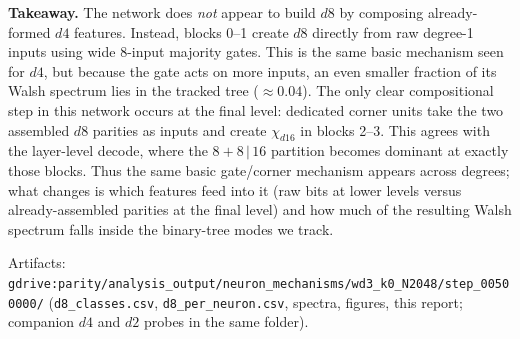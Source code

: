 \documentclass[10pt]{article}
\begin{document}
\textbf{Takeaway.} The network does \emph{not} appear to build $d8$ by composing already-formed
$d4$ features. Instead, blocks 0--1 create $d8$ directly from raw degree-1 inputs using wide
8-input majority gates. This is the same basic mechanism seen for $d4$, but because the gate
acts on more inputs, an even smaller fraction of its Walsh spectrum lies in the tracked tree
($\approx0.04$). The only clear compositional step in this network occurs at the final level:
dedicated corner units take the two assembled $d8$ parities as inputs and create
$\chi_{d16}$ in blocks 2--3. This agrees with the layer-level decode, where the
$8{+}8\,|\,16$ partition becomes dominant at exactly those blocks. Thus the same basic
gate/corner mechanism appears across degrees; what changes is which features feed into it
(raw bits at lower levels versus already-assembled parities at the final level) and how much
of the resulting Walsh spectrum falls inside the binary-tree modes we track.

\vfill\footnotesize
Artifacts: \texttt{gdrive:parity/analysis\_output/neuron\_mechanisms/wd3\_k0\_N2048/step\_00500000/}
(\texttt{d8\_classes.csv}, \texttt{d8\_per\_neuron.csv}, spectra, figures, this report;
companion $d4$ and $d2$ probes in the same folder).
\end{document}
